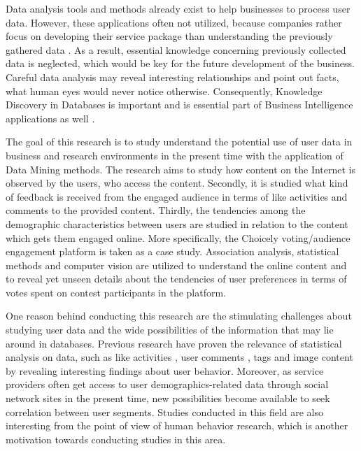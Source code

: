     Data analysis tools and methods already exist to help businesses to process user data. However, these applications often not utilized, because companies rather focus on developing their service package than understanding the previously gathered data \cite{inmon2007tapping, bigdatamanagementrevolution}. As a result, essential knowledge concerning previously collected data is neglected, which would be key for the future development of the business. Careful data analysis may reveal interesting relationships and point out facts, what human eyes would never notice otherwise. Consequently, Knowledge Discovery in Databases is important and is essential part of Business Intelligence applications as well \cite{zarsky2002mine, bigdatamanagementrevolution}. 
    
    The goal of this research is to study understand the potential use of user data in business and research environments in the present time with the application of Data Mining methods. The research aims to study how content on the Internet is observed by the users, who access the content. Secondly, it is studied what kind of feedback is received from the engaged audience in terms of like activities and comments to the provided content. Thirdly, the tendencies among the demographic characteristics between users are studied in relation to the content which gets them engaged online. More specifically, the Choicely voting/audience engagement platform is taken as a case study. Association analysis, statistical methods and computer vision are utilized to understand the online content and to reveal yet unseen details about the tendencies of user preferences in terms of votes spent on contest participants in the platform.
    
    One reason behind conducting this research are the stimulating challenges about studying user data and the wide possibilities of the information that may lie around in databases. Previous research have proven the relevance of statistical analysis on data, such as like activities \cite{jang2015noreciprocity, jang2016teensengagemorewithfewerphotos, ottoni2013ladies, guy2016whatsyourorganizationlike, jang2015no, youyou2015computer}, user comments \cite{jang2016teensengagemorewithfewerphotos}, tags \cite{jang2016teensengagemorewithfewerphotos} and image content \cite{hu2014we, bakhshi2014faces} by revealing interesting findings about user behavior. Moreover, as service providers often get access to user demographics-related data through social network sites in the present time, new possibilities become available to seek correlation between user segments. 
    Studies conducted in this field are also interesting from the point of view of human behavior research, which is another motivation towards conducting studies in this area. 

